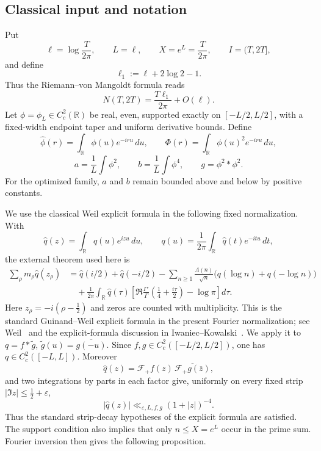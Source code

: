 \documentclass[11pt]{article}
\newcommand{\R}{\mathbb R}
\begin{document}
\subsection{Classical input and notation}

Put
\[
 \ell=\log\frac{T}{2\pi},\qquad L=\ell,\qquad
 X=e^L=\frac{T}{2\pi},\qquad I=(T,2T],
\]
and define
\begin{equation}\label{aiii:eq:ell1}
 \ell_1:=\ell+2\log2-1.
\end{equation}
Thus the Riemann--von Mangoldt formula reads
\[
 N(T,2T)=\frac{T\ell_1}{2\pi}+O(\ell).
\]
Let $\phi=\phi_L\in C_c^2(\R)$ be real, even, supported exactly on
$[-L/2,L/2]$, with a fixed-width endpoint taper and uniform derivative
bounds.  Define
\[
 \widehat\phi(r)=\int_\R \phi(u)e^{-iru}\,du,
 \qquad
 \Phi(r)=\int_\R \phi(u)^2e^{-iru}\,du,
\]
\[
 a=\frac1L\int\phi^2,\qquad
 b=\frac1L\int\phi^4,
 \qquad g=\phi^2*\phi^2.
\]
For the optimized family, $a$ and $b$ remain bounded above and below by
positive constants.

We use the classical Weil explicit formula in the following fixed
normalization. With
\[
 \widehat q(z)=\int_\R q(u)e^{izu}\,du,\qquad
 q(u)=\frac1{2\pi}\int_\R\widehat q(t)e^{-itu}\,dt,
\]
the external theorem used here is
\begin{align}
 \sum_\rho m_\rho\widehat q(z_\rho)
 &=
 \widehat q(i/2)+\widehat q(-i/2)
 -\sum_{n\ge1}\frac{\Lambda(n)}{\sqrt n}
 \bigl(q(\log n)+q(-\log n)\bigr)\nonumber\\
 &\quad+
 \frac1{2\pi}\int_\R\widehat q(\tau)
 \left[
 \Re\frac{\Gamma'}{\Gamma}
 \left(\frac14+\frac{i\tau}{2}\right)-\log\pi
 \right]d\tau .
 \label{aiii:eq:weil-classical}
\end{align}
Here $z_\rho=-i(\rho-\tfrac12)$ and zeros are counted with multiplicity.
This is the standard Guinand--Weil explicit formula in the present Fourier
normalization; see Weil~\cite{Weil52} and the explicit-formula discussion in
Iwaniec--Kowalski~\cite[\S5.5]{IK04}.
We apply it to
$q=f*\widetilde g$, $\widetilde g(u)=\overline{g(-u)}$.
Since $f,g\in C_c^2([-L/2,L/2])$, one has
$q\in C_c^2([-L,L])$.  Moreover
\[
 \widehat q(z)
 =
 \mathcal F_+f(z)\,
 \overline{\mathcal F_+g(\overline z)},
\]
and two integrations by parts in each factor give, uniformly on every fixed
strip $|\Im z|\le\tfrac12+\varepsilon$,
\[
 |\widehat q(z)|\ll_{\varepsilon,L,f,g}(1+|z|)^{-4}.
\]
Thus the standard strip-decay hypotheses of the explicit formula are
satisfied.  The support condition also implies that only
$n\le X=e^L$ occur in the prime sum. Fourier inversion then gives the
following proposition.
\end{document}

